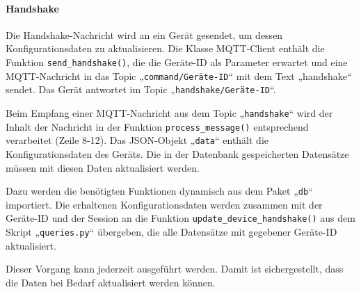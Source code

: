 \documentclass[12pt, letterpaper]{article}
\begin{document}
  \paragraph{Handshake}
  \par \textbf{}
  \par Die Handshake-Nachricht wird an ein Gerät gesendet, um dessen Konfigurationsdaten zu aktualisieren. Die Klasse MQTT-Client enthält die Funktion \texttt{send\_handshake()}, die die Geräte-ID als Parameter erwartet und eine MQTT-Nachricht in das Topic „\texttt{command/Geräte-ID}“ mit dem Text „handshake“ sendet. Das Gerät antwortet im Topic „\texttt{handshake/Geräte-ID}“.
  \par Beim Empfang einer MQTT-Nachricht aus dem Topic „\texttt{handshake}“ wird der Inhalt der Nachricht in der Funktion \texttt{process\_message()} entsprechend verarbeitet (Zeile 8-12). Das JSON-Objekt „\texttt{data}“ enthält die Konfigurationsdaten des Geräts. Die in der Datenbank gespeicherten Datensätze müssen mit diesen Daten aktualisiert werden. 
  \par Dazu werden die benötigten Funktionen dynamisch aus dem Paket „\texttt{db}“ importiert. Die erhaltenen Konfigurationsdaten werden zusammen mit der Geräte-ID und der Session an die Funktion \texttt{update\_device\_handshake()} aus dem Skript „\texttt{queries.py}“ übergeben, die alle Datensätze mit gegebener Geräte-ID aktualisiert.
  \par Dieser Vorgang kann jederzeit ausgeführt werden. Damit ist sichergestellt, dass die Daten bei Bedarf aktualisiert werden können.
\end{document}
